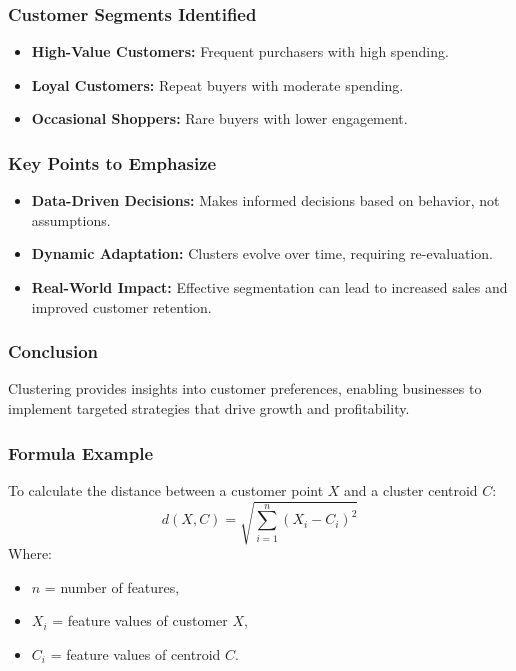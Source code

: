 \documentclass[aspectratio=169]{beamer}
\begin{document}
\begin{frame}[fragile]
    \frametitle{Customer Segments Identified}
    \begin{itemize}
        \item \textbf{High-Value Customers:} Frequent purchasers with high spending.
        \item \textbf{Loyal Customers:} Repeat buyers with moderate spending.
        \item \textbf{Occasional Shoppers:} Rare buyers with lower engagement.
    \end{itemize}
\end{frame}

\begin{frame}[fragile]
    \frametitle{Key Points to Emphasize}
    \begin{itemize}
        \item \textbf{Data-Driven Decisions:} Makes informed decisions based on behavior, not assumptions.
        \item \textbf{Dynamic Adaptation:} Clusters evolve over time, requiring re-evaluation.
        \item \textbf{Real-World Impact:} Effective segmentation can lead to increased sales and improved customer retention.
    \end{itemize}
\end{frame}

\begin{frame}[fragile]
    \frametitle{Conclusion}
    Clustering provides insights into customer preferences, enabling businesses to implement targeted strategies that drive growth and profitability.
\end{frame}

\begin{frame}[fragile]
    \frametitle{Formula Example}
    To calculate the distance between a customer point \(X\) and a cluster centroid \(C\):
    \begin{equation}
    d(X, C) = \sqrt{\sum_{i=1}^{n}(X_i - C_i)^2}
    \end{equation}
    Where:
    \begin{itemize}
        \item \(n\) = number of features,
        \item \(X_i\) = feature values of customer \(X\),
        \item \(C_i\) = feature values of centroid \(C\).
    \end{itemize}
\end{frame}
\end{document}

